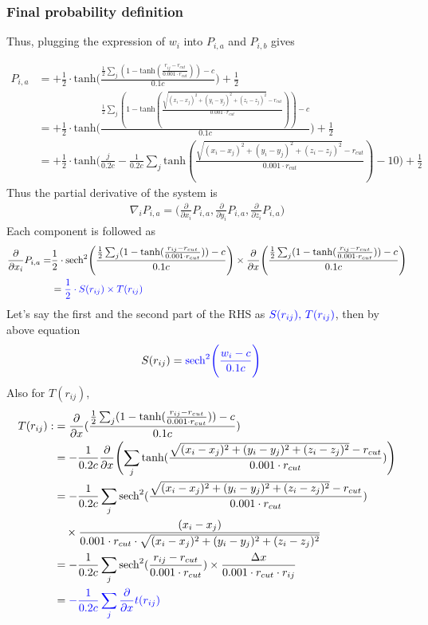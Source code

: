 \documentclass[11pt, oneside]{article}   	%
\begin{document}
\subsubsection{Final probability definition}
Thus, plugging the expression of $w_i$ into $P_{i,a}$ and $P_{i,b}$ gives

\begin{align*}
P_{i,a}  &= + \frac{1}{2} \cdot \textrm{tanh}\Biggl(\frac{ \frac{1}{2}  \sum_j (1-\textrm{tanh}(\frac{r_{ij} -r_{cut}}{0.001 \cdot r_{cut}})) - c}{0.1c}\Biggr) + \frac{1}{2}  \\
&= + \frac{1}{2} \cdot \textrm{tanh}\Biggl(\frac{  \frac{1}{2} \sum_j (1-\textrm{tanh}(\frac{\sqrt{(x_i-x_j)^2+(y_i-y_j)^2+(z_i-z_j)^2} -r_{cut}}{0.001 \cdot r_{cut}})) - c}{0.1c}\Biggr) + \frac{1}{2} \\
&=+ \frac{1}{2} \cdot \textrm{tanh}\Biggl( \frac{j}{0.2c} - \frac{1}{0.2c} \sum_j \textrm{tanh}(\frac{\sqrt{(x_i-x_j)^2+(y_i-y_j)^2+(z_i-z_j)^2} -r_{cut}}{0.001 \cdot r_{cut}}) -10\Biggr) + \frac{1}{2}
\end{align*}
Thus the partial derivative of the system is
\begin{align*}
\nabla_i P_{i,a} = \Biggl( \frac{\partial}{\partial x_i} P_{i,a},\frac{\partial}{\partial y_i} P_{i,a},\frac{\partial}{\partial z_i} P_{i,a}\Biggr)
\end{align*}
Each component is followed as
\begin{align*}
\frac{\partial}{\partial x_i} P_{i,a} =& \frac{1}{2} \cdot \textrm{sech}^2 \Biggl(\frac{ \frac{1}{2} \sum_j (1-\textrm{tanh}(\frac{r_{ij} -r_{cut}}{0.001 \cdot r_{cut}})) - c}{0.1c}\Biggr) \times \frac{\partial}{\partial x} \Biggl(\frac{  \frac{1}{2}  \sum_j (1-\textrm{tanh}(\frac{r_{ij} -r_{cut}}{0.001 \cdot r_{cut}})) - c}{0.1c}\Biggr) \\
&=\color{blue} \frac{1}{2} \cdot S(r_{ij}) \times T(r_{ij})
\end{align*}
Let's say the first and the second part of the RHS as $\color{blue} S(r_{ij}),\,T(r_{ij})$, then by above equation
\begin{align*}
S(r_{ij}) & = \color{blue}\textrm{sech}^2 \Biggl( \frac{w_i - c}{0.1c}\Biggr)
\end{align*}
Also for $T(r_{ij})$,
\begin{align*}
T(r_{ij}) :&=\frac{\partial}{\partial x} (\frac{  \frac{1}{2} \sum_j (1-\textrm{tanh}(\frac{r_{ij} -r_{cut}}{0.001 \cdot r_{cut}})) - c}{0.1c}) \\
&=  - \frac{1}{0.2c} \frac{\partial}{\partial x} \Biggl( \sum_j \textrm{tanh}(\frac{\sqrt{(x_i-x_j)^2+(y_i-y_j)^2+(z_i-z_j)^2} -r_{cut}}{0.001 \cdot r_{cut}}) \Biggr)\\
& = -\frac{1}{0.2c} \sum_j \textrm{sech}^2 (\frac{\sqrt{(x_i-x_j)^2+(y_i-y_j)^2+(z_i-z_j)^2} -r_{cut}}{0.001 \cdot r_{cut}}) \\
& \quad \times \frac{(x_i - x_j)}{0.001\cdot r_{cut}\cdot\sqrt{(x_i-x_j)^2+(y_i-y_j)^2+(z_i-z_j)^2}} \\
&= - \frac{1}{0.2c} \sum_j \textrm{sech}^2(\frac{r_{ij} - r_{cut}}{0.001 \cdot r_{cut}}) \times \frac{\Delta x}{0.001\cdot r_{cut} \cdot r_{ij}} \\
&= \color{blue} -\frac{1}{0.2c} \sum_j \frac{\partial}{\partial x} t(r_{ij})
\end{align*}
\end{document}
